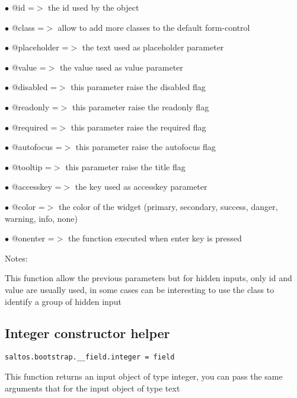 \documentclass[a4paper]{book}
\begin{document}
\begin{compactitem}
\item[\color{myblue}$\bullet$] @id          =$>$ the id used by the object
\item[\color{myblue}$\bullet$] @class       =$>$ allow to add more classes to the default form-control
\item[\color{myblue}$\bullet$] @placeholder =$>$ the text used as placeholder parameter
\item[\color{myblue}$\bullet$] @value       =$>$ the value used as value parameter
\item[\color{myblue}$\bullet$] @disabled    =$>$ this parameter raise the disabled flag
\item[\color{myblue}$\bullet$] @readonly    =$>$ this parameter raise the readonly flag
\item[\color{myblue}$\bullet$] @required    =$>$ this parameter raise the required flag
\item[\color{myblue}$\bullet$] @autofocus   =$>$ this parameter raise the autofocus flag
\item[\color{myblue}$\bullet$] @tooltip     =$>$ this parameter raise the title flag
\item[\color{myblue}$\bullet$] @accesskey   =$>$ the key used as accesskey parameter
\item[\color{myblue}$\bullet$] @color       =$>$ the color of the widget (primary, secondary, success, danger, warning, info, none)
\item[\color{myblue}$\bullet$] @onenter     =$>$ the function executed when enter key is pressed
\end{compactitem}

Notes:

This function allow the previous parameters but for hidden inputs, only id
and value are usually used, in some cases can be interesting to use the
class to identify a group of hidden input

\hypertarget{toc462}{}
\subsection{Integer constructor helper}

\begin{lstlisting}
saltos.bootstrap.__field.integer = field
\end{lstlisting}

This function returns an input object of type integer, you can pass the same arguments
that for the input object of type text
\end{document}
